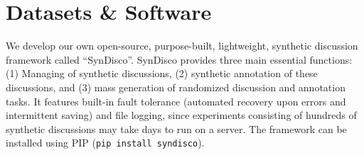 \section{Datasets \& Software}

We develop our own open-source, purpose-built, lightweight, synthetic discussion framework called “SynDisco”. SynDisco provides three main essential functions: (1) Managing of synthetic discussions, (2) synthetic annotation of these discussions, and (3) mass generation of randomized discussion and annotation tasks. It features built-in fault tolerance (automated recovery upon errors and intermittent saving) and file logging, since experiments consisting of hundreds of synthetic discussions may take days to run on a server. The framework can be installed using PIP (\texttt{pip install  syndisco}).